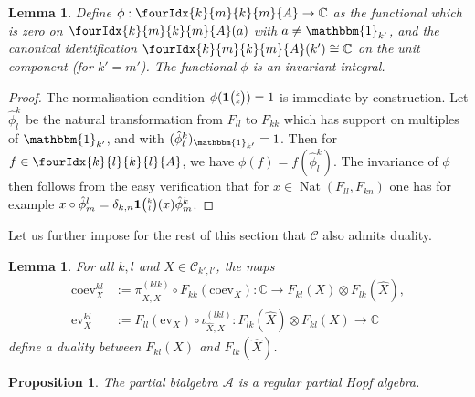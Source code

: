 \documentclass[10pt]{article}
\DeclareMathOperator{\Nat}{\mathrm{Nat}}
\newcommand{\C}{\mathbb{C}}
\newcommand{\CatCC}{\mathscr{C}}
\newcommand{\ev}{\mathrm{ev}}
\newcommand{\coev}{\mathrm{coev}}
\newcommand{\Grt}[3]{#1{\tiny {\begin{pmatrix} #2\\#3\end{pmatrix}}}}
\newcommand{\Unitb}{\mathbbm{1}}
\newcommand{\UnitC}[2]{\Grt{\mathbf{1}}{#1}{#2}}
\newcommand{\Gr}[5]{\fourIdx{#2}{#4}{#3}{#5}{#1}}%
\newtheorem{Lem}[Theorem]{Lemma}
\newtheorem{Prop}[Theorem]{Proposition}
\theoremstyle{definition}
\numberwithin{equation}{section}
\begin{document}

\begin{Lem} Define $\phi: \Gr{A}{k}{k}{m}{m} \rightarrow \C$ as the functional which is zero on $\Gr{A}{k}{k}{m}{m}(a)$ with $a\neq \Unitb_{k'}$, and the canonical identification $\Gr{A}{k}{k}{m}{m}(k')\cong \C$ on the unit component (for $k'=m'$). The functional $\phi$ is an invariant integral.
\end{Lem}

\begin{proof} The normalisation condition $\phi(\UnitC{k}{k})=1$ is immediate by construction. Let $\hat{\phi}^k_l$ be the natural transformation from $F_{ll}$ to $F_{kk}$ which has support on multiples of $\Unitb_{k'}$, and with $(\hat{\phi}^k_l)_{\Unitb_{k'}} = 1$.  Then for $f\in \Gr{A}{k}{k}{l}{l}$, we have $\phi(f) = f(\hat{\phi}^k_l)$. The invariance of $\phi$ then follows from the easy verification that for $x\in \Nat(F_{ll},F_{kn})$ one has for example $x\circ \hat{\phi}^l_m =\delta_{k,n} \UnitC{k}{l}(x)\hat{\phi}^k_m$. 
\end{proof}

Let us further impose for the rest of this section that $\CatCC$ also admits duality.  
\begin{Lem}
  For all $k,l$ and $X\in \mathcal{C}_{k',l'}$,  the maps
  \begin{align*}
    \coev^{kl}_{X}  &:=  \pi^{(klk)}_{X,\hat X} \circ F_{kk}(\coev_{X})\colon \C \to F_{kl}(X)
    \otimes F_{lk}(\hat X), \\
    \ev^{kl}_{X} &:=  F_{ll}(\ev_{X}) \circ \iota^{(lkl)}_{\hat X,X} \colon
    F_{lk}(\hat X) \otimes F_{kl}(X) \to \C
  \end{align*}
  define a duality between $F_{kl}(X)$ and $F_{lk}(\hat X)$.
\end{Lem}


\begin{Prop}\label{PropAnti} The partial bialgebra $\mathscr{A}$ is a regular partial Hopf algebra.
\end{Prop} 
\end{document}

